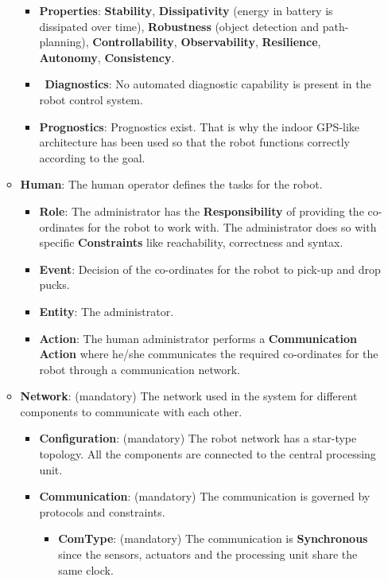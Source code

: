\begin{itemize}
\begin{itemize}
\begin{itemize}
            \item \checkmark \textbf{Properties}: \textbf{Stability}, \textbf{Dissipativity} (energy in battery is dissipated over time), \textbf{Robustness} (object detection and path-planning), \textbf{Controllability}, \textbf{Observability}, \textbf{Resilience}, \textbf{Autonomy}, \textbf{Consistency}. 
            \item \xmark\ \textbf{Diagnostics}: No automated diagnostic capability is present in the robot control system.
            \item \checkmark \textbf{Prognostics}: Prognostics exist. That is why the indoor GPS-like architecture has been used so that the robot functions correctly according to the goal.
        \end{itemize}
        \item \checkmark \textbf{Human}: The human operator defines the tasks for the robot.
        \begin{itemize}
            \item \checkmark \textbf{Role}: The administrator has the \textbf{Responsibility} of providing the co-ordinates for the robot to work with. The administrator does so with specific \textbf{Constraints} like reachability, correctness and syntax. 
            \item \checkmark \textbf{Event}: Decision of the co-ordinates for the robot to pick-up and drop pucks.
            \item \checkmark \textbf{Entity}: The administrator.
            \item \checkmark \textbf{Action}: The human administrator performs a \textbf{Communication Action} where he/she communicates the required co-ordinates for the robot through a communication network.
        \end{itemize}
        \item \checkmark \textbf{Network}: (mandatory) The network used in the system for different components to communicate with each other.
        \begin{itemize}
            \item \checkmark \textbf{Configuration}: (mandatory) The robot network has a star-type topology. All the components are connected to the central processing unit.
            \item \checkmark \textbf{Communication}: (mandatory) The communication is governed by protocols and constraints. 
            \begin{itemize}
                \item \checkmark \textbf{ComType}: (mandatory) The communication is \textbf{Synchronous} since the sensors, actuators and the processing unit share the same clock.

\end{itemize}
\end{itemize}
\end{itemize}
\end{itemize}
